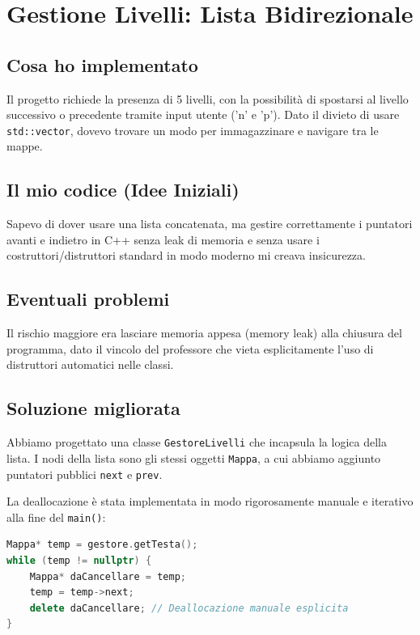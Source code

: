 \documentclass[12pt,a4paper]{article}
\begin{document}
\section{Gestione Livelli: Lista Bidirezionale}

\subsection{Cosa ho implementato}
Il progetto richiede la presenza di 5 livelli, con la possibilità di spostarsi al livello successivo o precedente tramite input utente ('n' e 'p'). Dato il divieto di usare \texttt{std::vector}, dovevo trovare un modo per immagazzinare e navigare tra le mappe.

\subsection{Il mio codice (Idee Iniziali)}
Sapevo di dover usare una lista concatenata, ma gestire correttamente i puntatori avanti e indietro in C++ senza leak di memoria e senza usare i costruttori/distruttori standard in modo moderno mi creava insicurezza.

\subsection{Eventuali problemi}
Il rischio maggiore era lasciare memoria appesa (memory leak) alla chiusura del programma, dato il vincolo del professore che vieta esplicitamente l'uso di distruttori automatici nelle classi.

\subsection{Soluzione migliorata}
Abbiamo progettato una classe \texttt{GestoreLivelli} che incapsula la logica della lista. I nodi della lista sono gli stessi oggetti \texttt{Mappa}, a cui abbiamo aggiunto puntatori pubblici \texttt{next} e \texttt{prev}.

La deallocazione è stata implementata in modo rigorosamente manuale e iterativo alla fine del \texttt{main()}:

\begin{lstlisting}[language=C++]
Mappa* temp = gestore.getTesta();
while (temp != nullptr) {
    Mappa* daCancellare = temp;
    temp = temp->next;
    delete daCancellare; // Deallocazione manuale esplicita
}
\end{lstlisting}
\end{document}
